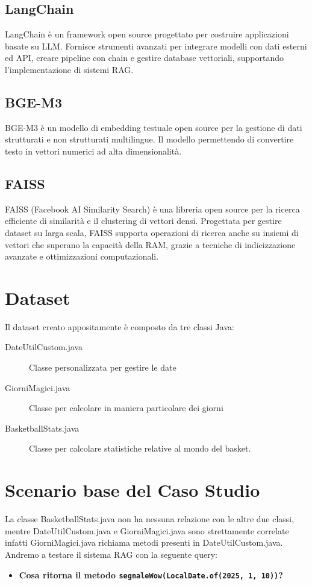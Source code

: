 \documentclass[12pt,a4paper,openright,twoside]{book}
\begin{document}
\subsection{LangChain}
LangChain \cite{langchain} è un framework open source progettato per costruire applicazioni basate su LLM.
Fornisce strumenti avanzati per integrare modelli con dati esterni ed API, creare pipeline con chain
e gestire database vettoriali, supportando l'implementazione di sistemi RAG.

\subsection{BGE-M3}
BGE-M3 \cite{bge-m3} è un modello di embedding testuale open source per la gestione di dati strutturati e non strutturati multilingue.
Il modello permettendo di convertire testo in vettori numerici ad alta dimensionalità.

\subsection{FAISS}
FAISS (Facebook AI Similarity Search) \cite{faiss} è una libreria open source per la ricerca efficiente di similarità e il clustering di vettori densi.
Progettata per gestire dataset su larga scala, FAISS supporta operazioni di ricerca anche su insiemi di vettori che superano la capacità della RAM, grazie a tecniche di indicizzazione avanzate e ottimizzazioni computazionali.

\section{Dataset}
Il dataset creato appositamente è composto da tre classi Java:

\begin{description}
    \item[DateUtilCustom.java] Classe personalizzata per gestire le date
    \item[GiorniMagici.java] Classe per calcolare in maniera particolare dei giorni
    \item[BasketballStats.java] Classe per calcolare statistiche relative al mondo del basket.
\end{description}

\section{Scenario base del Caso Studio}
La classe BasketballStats.java non ha nessuna relazione con le altre due classi,
mentre DateUtilCustom.java e GiorniMagici.java sono strettamente correlate infatti GiorniMagici.java richiama metodi presenti in DateUtilCustom.java.
Andremo a testare il sistema RAG con la seguente query: 
\begin{itemize}
    \item \textbf{Cosa ritorna il metodo \texttt{segnaleWow(LocalDate.of(2025, 1, 10))}?}
\end{itemize}
\end{document}
